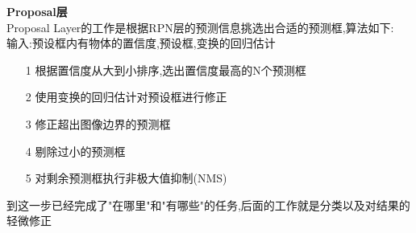 \begin{frame}
    \vspace{0.5em}
    \noindent\large\textbf{Proposal层}\\
    \vspace{0.5em}
    Proposal Layer的工作是根据RPN层的预测信息挑选出合适的预测框,算法如下:\\
    \vspace{0.2em}
    输入:预设框内有物体的置信度,预设框,变换的回归估计
    \vspace{0.2em}
    \begin{itemize}
        \item[1]根据置信度从大到小排序,选出置信度最高的N个预测框
        \item[2]使用变换的回归估计对预设框进行修正
        \item[3]修正超出图像边界的预测框
        \item[4]剔除过小的预测框
        \item[5]对剩余预测框执行非极大值抑制(NMS)
    \end{itemize}
    \vspace{0.5em}
    到这一步已经完成了"在哪里"和"有哪些"的任务,后面的工作就是分类以及对结果的轻微修正
\end{frame}




